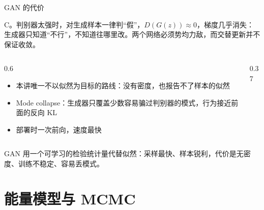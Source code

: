 \documentclass[aspectratio=169,10pt,UTF8,fontset=none]{ctexbeamer}
\begin{document}
\begin{frame}{GAN 的代价}
  \begin{answer}
    C。判别器太强时，对生成样本一律判“假”，$D(G(z))\approx0$，梯度几乎消失：生成器只知道“不行”，不知道往哪里改。两个网络必须势均力敌，而交替更新并不保证收敛。
  \end{answer}
  \begin{columns}[T]
    \begin{column}{0.6\textwidth}
      \begin{itemize}
        \item 本讲唯一不以似然为目标的路线：没有密度，也报告不了样本的似然
        \item Mode collapse：生成器只覆盖少数容易骗过判别器的模式，行为接近前面的反向 KL
        \item 部署时一次前向，速度最快
      \end{itemize}
    \end{column}
    \begin{column}{0.37\textwidth}
      \centering
    \end{column}
  \end{columns}
  \vspace{1.5mm}
  {\small{}}
  \vfill
  \begin{takeaway}[小结]
    GAN 用一个可学习的检验统计量代替似然：采样最快、样本锐利，代价是无密度、训练不稳定、容易丢模式。
  \end{takeaway}
\end{frame}

\section{能量模型与 MCMC}
\end{document}
